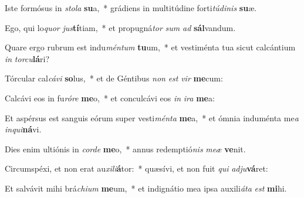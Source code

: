 \item Iste formósus in \textit{sto}\textit{la} \textbf{su}a,~* grádiens in multitúdine forti\textit{tú}\textit{di}\textit{nis} \textbf{su}æ.
\item Ego, qui lo\textit{quor} \textit{jus}\textbf{tí}tiam,~* et propugná\textit{tor} \textit{sum} \textit{ad} \textbf{sál}vandum.
\item Quare ergo rubrum est indu\textit{mén}\textit{tum} \textbf{tu}um,~* et vestiménta tua sicut calcántium \textit{in} \textit{tor}\textit{cu}\textbf{lá}ri?
\item Tórcular cal\textit{cá}\textit{vi} \textbf{so}lus,~* et de Géntibus \textit{non} \textit{est} \textit{vir} \textbf{me}cum:
\item Calcávi eos in fu\textit{ró}\textit{re} \textbf{me}o,~* et conculcávi eos \textit{in} \textit{i}\textit{ra} \textbf{me}a:
\item Et aspérsus est sanguis eórum super vesti\textit{mén}\textit{ta} \textbf{me}a,~* et ómnia induménta me\textit{a} \textit{in}\textit{qui}\textbf{ná}vi.
\item Dies enim ultiónis in \textit{cor}\textit{de} \textbf{me}o,~* annus redemptió\textit{nis} \textit{me}\textit{æ} \textbf{ve}nit.
\item Circumspéxi, et non erat au\textit{xi}\textit{li}\textbf{á}tor:~* quæsívi, et non fuit \textit{qui} \textit{ad}\textit{ju}\textbf{vá}ret:
\item Et salvávit mihi brá\textit{chi}\textit{um} \textbf{me}um,~* et indignátio mea ipsa auxili\textit{á}\textit{ta} \textit{est} \textbf{mi}hi.
